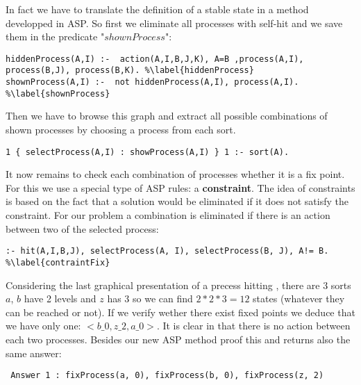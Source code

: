 In fact we have to translate the definition of a stable state in a method developped in ASP. So first we eliminate all processes with self-hit and we save them in the predicate "$shownProcess$":
\begin{lstlisting}
hiddenProcess(A,I) :-  action(A,I,B,J,K), A=B ,process(A,I), process(B,J), process(B,K). %\label{hiddenProcess}
shownProcess(A,I) :-  not hiddenProcess(A,I), process(A,I). %\label{shownProcess}
\end{lstlisting}
Then we have to browse this graph and extract all possible combinations of shown processes by choosing a process from each sort.
\begin{lstlisting}
1 { selectProcess(A,I) : showProcess(A,I) } 1 :- sort(A).
\end{lstlisting}
It now remains to check each combination of processes whether it is a fix point. For this we use a special type of ASP rules: a \textbf{constraint}. The idea of constraints is based on the fact that a solution would be eliminated if it does not satisfy the constraint. For our problem a combination is eliminated if there is an action between two of the selected process:
\begin{lstlisting}
:- hit(A,I,B,J), selectProcess(A, I), selectProcess(B, J), A!= B. %\label{contraintFix}
\end{lstlisting}

\begin{example*}
Considering the last graphical presentation of a precess hitting , there are 3 sorts $a$, $b$ have 2 levels and $z$ has 3 so we can find $2*2*3 = 12$ states (whatever they can be reached or not). If we verify wether there exist fixed points we deduce that we have only one: $<b\_0, z\_2, a\_0>$. It is clear in  that there is no action between each two processes. Besides our new ASP method proof this and returns also the same answer:
\begin{tabbing}
 \texttt{
 Answer 1 : fixProcess(a, 0), fixProcess(b, 0), fixProcess(z, 2)
 }
\end{tabbing}
\end{example*}